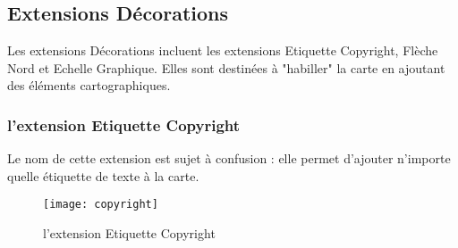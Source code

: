 
\subsection{Extensions Décorations}


Les extensions Décorations incluent les extensions Etiquette Copyright,
Flèche Nord et Echelle Graphique. Elles sont destinées à "habiller" la carte
en ajoutant des éléments cartographiques.

\subsubsection{l'extension Etiquette Copyright}

Le nom de cette extension est sujet à confusion : elle permet d'ajouter n'importe quelle étiquette de texte à la carte.

\begin{figure}[ht]
   \begin{center}
   \caption{l'extension Etiquette Copyright\nixcaption}\label{fig:copyright}\smallskip
   \texttt{[image: copyright]}
\end{center}
\end{figure}

